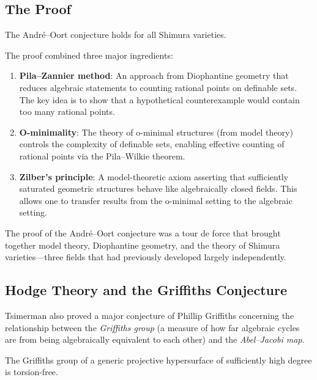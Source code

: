 \subsection{The Proof}

\begin{theorem}
The André--Oort conjecture holds for all Shimura varieties.
\end{theorem}

The proof combined three major ingredients:

\begin{enumerate}
\item \textbf{Pila--Zannier method}: An approach from Diophantine geometry that reduces algebraic statements to counting rational points on definable sets. The key idea is to show that a hypothetical counterexample would contain too many rational points.
\item \textbf{O-minimality}: The theory of o-minimal structures (from model theory) controls the complexity of definable sets, enabling effective counting of rational points via the Pila--Wilkie theorem.
\item \textbf{Zilber's principle}: A model-theoretic axiom asserting that sufficiently saturated geometric structures behave like algebraically closed fields. This allows one to transfer results from the o-minimal setting to the algebraic setting.
\end{enumerate}

\begin{highlightbox}
The proof of the André--Oort conjecture was a tour de force that brought together model theory, Diophantine geometry, and the theory of Shimura varieties---three fields that had previously developed largely independently.
\end{highlightbox}

\subsection{Hodge Theory and the Griffiths Conjecture}

Tsimerman also proved a major conjecture of Phillip Griffiths concerning the relationship between the \emph{Griffiths group} (a measure of how far algebraic cycles are from being algebraically equivalent to each other) and the \emph{Abel--Jacobi map}.

\begin{theorem}
The Griffiths group of a generic projective hypersurface of sufficiently high degree is torsion-free.
\end{theorem}

